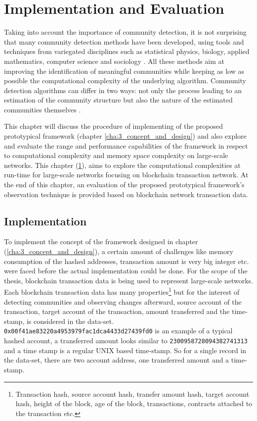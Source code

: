 \chapter{Implementation and Evaluation}\label{cha:4_implementation_and_evaluation}
Taking into account the importance of community detection, it is not surprising that many community detection methods have been developed, using tools and techniques from variegated disciplines such as statistical physics, biology, applied mathematics, computer science and sociology \cite{ref-49}. All these methods aim at improving the identification of meaningful communities while keeping as low as possible the computational complexity of the underlying algorithm. Community detection algorithms can differ in two ways: not only the process leading to an estimation of the community structure but also the nature of the estimated communities themselves \cite{ref-50}. 

This chapter will discuss the procedure of implementing of the proposed prototypical framework (chapter \ref{cha:3_concept_and_design}) and also explore and evaluate the range and performance capabilities of the framework in respect to computational complexity and memory space complexity on large-scale networks. This chapter (\ref{cha:4_implementation_and_evaluation}), aims to explore the computational complexities at run-time for large-scale networks focusing on blockchain transaction network. At the end of this chapter, an evaluation of the proposed prototypical framework's observation technique is provided based on blockchain network transaction data.

\section{Implementation}
To implement the concept of the framework designed in chapter (\ref{cha:3_concept_and_design}), a certain amount of challenges like memory consumption of the hashed addresses, transaction amount is very big integer etc. were faced before the actual implementation could be done. For the scope of the thesis, blockchain transaction data is being used to represent large-scale networks. Each blockchain transaction data has many properties\footnote{Transaction hash, source account hash, transfer amount hash, target account hash, height of the block, age of the block, transactions, contracts attached to the transaction etc.} but for the interest of detecting communities and observing changes afterward, source account of the transaction, target account of the transaction, amount transferred and the time-stamp, is considered in the data-set. \\ \texttt{0x00f41ae83220a4953979fac1dca4433d27439fd0} is an example of a typical hashed account, a transferred amount looks similar to \texttt{2300958728094382741313} and a time stamp is a regular UNIX based time-stamp. So for a single record in the data-set, there are two account address, one transferred amount and a time-stamp.

